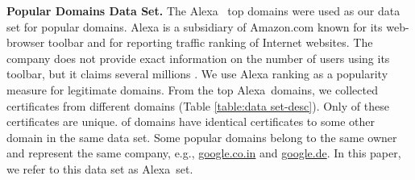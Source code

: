 \documentclass[twocolumn]{article}
\newcommand{\descr}[1]{\bigskip \noindent \textbf{#1}}
\newcommand{\Alexa}{\textsf{Alexa}}
\begin{document}
\begin{table*}[t]
\vspace{-0.2cm}
\caption{\label{tbl:features} \textbf{\small Features extracted from SSL
certificates.}}
\end{table*}

\descr{Popular Domains Data Set.}
The Alexa~\cite{alexa} top  domains were used as our data set for popular domains. 
Alexa is a subsidiary of {\sf Amazon.com} known for its
web-browser toolbar and for reporting traffic ranking of Internet websites.
The company does not provide exact information on the number
of users using its toolbar, but it claims several millions \cite{alexa-ranking}.
We use Alexa ranking as a popularity measure for legitimate domains. From the top  \Alexa\ domains, we collected 
certificates from  different domains (Table \ref{table:data set-desc}). Only  of these certificates are unique.  of domains have identical certificates to some other domain in the same data set. Some popular domains belong to the same owner and represent the same company, e.g., \url{google.co.in} and \url{google.de}. In this paper, we refer to this data set as \Alexa\ set. 
\end{document}
